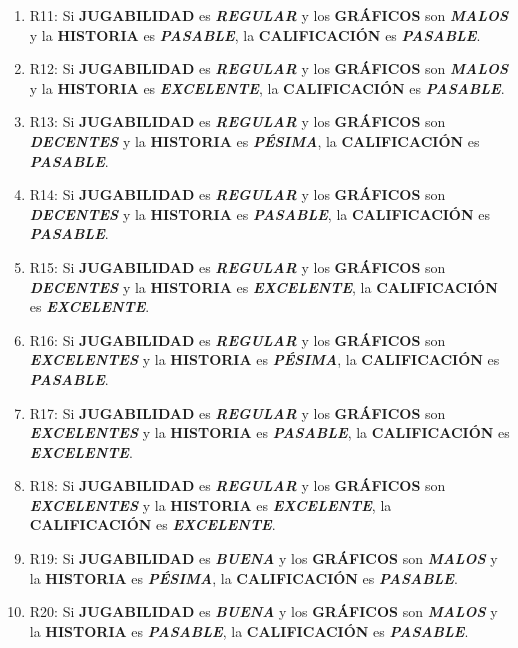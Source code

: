 \documentclass[11pt, letterpaper]{article}
\begin{document}
\begin{enumerate}
	\item R11: Si \textbf{JUGABILIDAD} es \textbf{\textit{REGULAR}} y los \textbf{GRÁFICOS} son \textbf{\textit{MALOS}} y la \textbf{HISTORIA} es \textbf{\textit{PASABLE}}, la \textbf{CALIFICACIÓN} es \textbf{\textit{PASABLE}}.
	\item R12: Si \textbf{JUGABILIDAD} es \textbf{\textit{REGULAR}} y los \textbf{GRÁFICOS} son \textbf{\textit{MALOS}} y la \textbf{HISTORIA} es \textbf{\textit{EXCELENTE}}, la \textbf{CALIFICACIÓN} es \textbf{\textit{PASABLE}}.
	\item R13: Si \textbf{JUGABILIDAD} es \textbf{\textit{REGULAR}} y los \textbf{GRÁFICOS} son \textbf{\textit{DECENTES}} y la \textbf{HISTORIA} es \textbf{\textit{PÉSIMA}}, la \textbf{CALIFICACIÓN} es \textbf{\textit{PASABLE}}.
	\item R14: Si \textbf{JUGABILIDAD} es \textbf{\textit{REGULAR}} y los \textbf{GRÁFICOS} son \textbf{\textit{DECENTES}} y la \textbf{HISTORIA} es \textbf{\textit{PASABLE}}, la \textbf{CALIFICACIÓN} es \textbf{\textit{PASABLE}}.
	\item R15: Si \textbf{JUGABILIDAD} es \textbf{\textit{REGULAR}} y los \textbf{GRÁFICOS} son \textbf{\textit{DECENTES}} y la \textbf{HISTORIA} es \textbf{\textit{EXCELENTE}}, la \textbf{CALIFICACIÓN} es \textbf{\textit{EXCELENTE}}.
	\item R16: Si \textbf{JUGABILIDAD} es \textbf{\textit{REGULAR}} y los \textbf{GRÁFICOS} son \textbf{\textit{EXCELENTES}} y la \textbf{HISTORIA} es \textbf{\textit{PÉSIMA}}, la \textbf{CALIFICACIÓN} es \textbf{\textit{PASABLE}}.
	\item R17: Si \textbf{JUGABILIDAD} es \textbf{\textit{REGULAR}} y los \textbf{GRÁFICOS} son \textbf{\textit{EXCELENTES}} y la \textbf{HISTORIA} es \textbf{\textit{PASABLE}}, la \textbf{CALIFICACIÓN} es \textbf{\textit{EXCELENTE}}.
	\item R18: Si \textbf{JUGABILIDAD} es \textbf{\textit{REGULAR}} y los \textbf{GRÁFICOS} son \textbf{\textit{EXCELENTES}} y la \textbf{HISTORIA} es \textbf{\textit{EXCELENTE}}, la \textbf{CALIFICACIÓN} es \textbf{\textit{EXCELENTE}}.
	\item R19: Si \textbf{JUGABILIDAD} es \textbf{\textit{BUENA}} y los \textbf{GRÁFICOS} son \textbf{\textit{MALOS}} y la \textbf{HISTORIA} es \textbf{\textit{PÉSIMA}}, la \textbf{CALIFICACIÓN} es \textbf{\textit{PASABLE}}.
	\item R20: Si \textbf{JUGABILIDAD} es \textbf{\textit{BUENA}} y los \textbf{GRÁFICOS} son \textbf{\textit{MALOS}} y la \textbf{HISTORIA} es \textbf{\textit{PASABLE}}, la \textbf{CALIFICACIÓN} es \textbf{\textit{PASABLE}}.

\end{enumerate}
\end{document}
